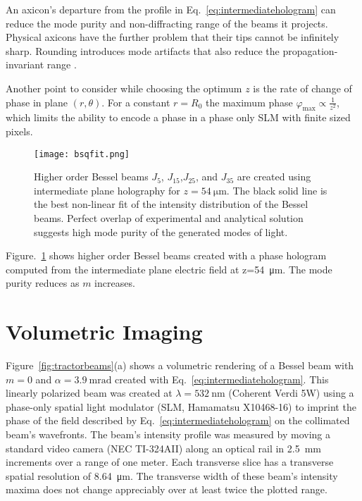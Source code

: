 An axicon's departure from the profile
in Eq.~\eqref{eq:intermediatehologram}
can reduce the mode purity and non-diffracting
range of the beams it projects.
Physical axicons have the further problem that
their tips cannot be infinitely sharp.
Rounding introduces mode artifacts that also reduce the 
propagation-invariant range \cite{brzobohaty08}.

Another point to consider while choosing the optimum $z$
is the rate of change of phase in plane $(r,\theta)$. For a 
constant $r=R_0$ the maximum phase 
$\varphi _{\mathrm{max}}\propto \frac{1}{z^2}$, which
limits the ability to encode a phase in a phase only SLM 
with finite sized pixels.

\begin{figure}[t!]
  \centering
  \texttt{[image: bsqfit.png]}
  \caption{Higher order Bessel beams $J_{5}$,
 $ J_{15}$,$ J_{25}$, and $J_{35}$ are created using 
  intermediate plane holography for 
  $z=\SI{54 }{\um}$. The black solid line is 
  the best non-linear fit of the intensity distribution of
  the Bessel beams. Perfect overlap of experimental and 
  analytical solution suggests high mode purity of the
  generated modes of light.}
  \label{fig:bessel quality}
\end{figure}

Figure.~\ref{fig:bessel quality} shows higher order Bessel
beams created with a phase hologram computed from the 
intermediate plane electric field at z=\SI{54}{\um}.
The mode purity reduces as $m$ increases.


\section{Volumetric Imaging}

Figure~\ref{fig:tractorbeams}(a) shows a volumetric
rendering of a Bessel beam with $m = 0$ and
$\alpha = \SI{3.9}{\milli\radian}$ created with
Eq.~\eqref{eq:intermediatehologram}.
This linearly polarized beam was created at $\lambda = \SI{532}{\nm}$
(Coherent Verdi 5W)
using a phase-only spatial light modulator (SLM, Hamamatsu X10468-16)
to imprint the phase of the field described by
Eq.~\eqref{eq:intermediatehologram}
on the collimated beam's wavefronts.
The beam's intensity profile was measured by
moving a standard
video camera (NEC TI-324AII) along an optical rail in \SI{2.5}{\mm}
increments over a range of one meter.
Each transverse slice has a transverse spatial resolution of \SI{8.64}{\um}.
The transverse width of these beam's intensity maxima does not change
appreciably over at least twice the plotted range.


